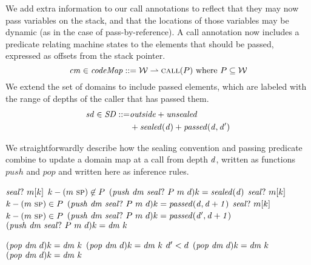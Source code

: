 \documentclass[10pt,conference]{ieeetran}%
\theoremstyle{definition}
\begin{document}
{We add extra information to our call
annotations to reflect that they may now pass variables on the stack, and that the locations
of those variables may be dynamic (as in the case of pass-by-reference).
A call annotation now includes a predicate relating machine states to the elements
that should be passed, expressed as offsets from the stack pointer.
\[\mathit{cm} \in \mathit{codeMap} ::= {\mathcal W} \rightharpoonup \text{\sc call}(P)~\relax{\rm where}~P \subseteq {\mathcal W}\]
We extend the set of domains to include passed elements,
which are labeled with the range of depths of the caller that has passed them.
\[\begin{split}
\mathit{sd} \in \mathit{SD} ::= & \mathit{outside} + \mathit{unsealed}\\
& + \mathit{sealed(d)} + \mathit{passed(d,d')}
\end{split}\]

We straightforwardly describe how the sealing convention and passing predicate combine to
update a domain map at a call from depth \(d\), written as functions \(\mathit{push}\)
and \(\mathit{pop}\) and written here as inference rules.

\judgmentthree[]
              {\(\domMap ~ \component = \unsealed\)}
              {\(\mathit{seal?} ~ m[k]\)}
              {\(k - (m ~ \textsc{sp}) \not \in P\)}
              {\((\mathit{push} ~ \mathit{dm} ~ \mathit{seal?} ~ P ~ m ~ d) k = \mathit{sealed(d)}\)}
\judgmentthree[]
              {\(\domMap ~ \component = \unsealed\)}
              {\(\mathit{seal?} ~ m[k]\)}
              {\(k - (m ~ \textsc{sp}) \in P\)}
              {\((\mathit{push} ~ \mathit{dm} ~ \mathit{seal?} ~ P ~ m ~ d) k = \mathit{passed(d,d+1)}\)}
              {\(\mathit{seal?} ~ m[k]\)}
              {\(k - (m ~ \textsc{sp}) \in P\)}
              {\((\mathit{push} ~ \mathit{dm} ~ \mathit{seal?} ~ P ~ m ~ d) k = \mathit{passed(d',d+1)}\)}
\judgment[]
         {}
         {\((\mathit{push} ~ \mathit{dm} ~ \mathit{seal?} ~ P ~ m ~ d) k = \mathit{dm} ~ k\)}

\judgment[]
         {\(\domMap ~ \component = \sealed{\depth}\)}
         {\((\mathit{pop} ~ \mathit{dm} ~ d) k = \mathit{dm} ~ k\)}
         {\((\mathit{pop} ~ \mathit{dm} ~ d) k = \mathit{dm} ~ k\)}
           {\(d' < d\)}
           {\((\mathit{pop} ~ \mathit{dm} ~ d) k = \mathit{dm} ~ k\)}
\judgment[]
         {}
         {\((\mathit{pop} ~ \mathit{dm} ~ d) k = \mathit{dm} ~ k\)}

}
\end{document}
